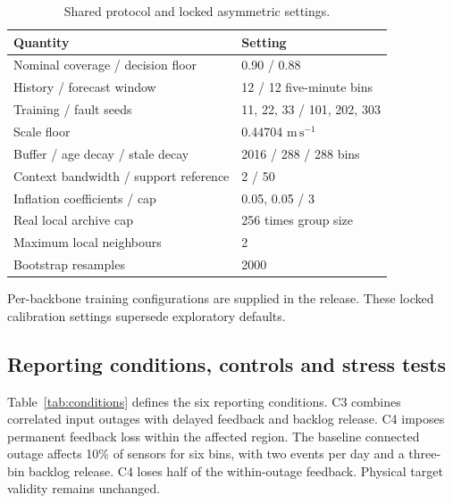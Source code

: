 \documentclass[pdflatex,sn-mathphys-num]{sn-jnl}
\newcommand{\ms}{\mathrm{m\,s^{-1}}}
\begin{document}
\begin{table}[!htbp]
\caption{Shared protocol and locked asymmetric settings.}\label{tab:settings}
\centering\setlength{\tabcolsep}{3pt}\small
\begin{tabular}{ll}\toprule
Quantity & Setting \\\midrule
Nominal coverage / decision floor & 0.90 / 0.88 \\
History / forecast window & 12 / 12 five-minute bins \\
Training / fault seeds & 11, 22, 33 / 101, 202, 303 \\
Scale floor & 0.44704 $\ms$ \\
Buffer / age decay / stale decay & 2016 / 288 / 288 bins \\
Context bandwidth / support reference & 2 / 50 \\
Inflation coefficients / cap & 0.05, 0.05 / 3 \\
Real local archive cap & 256 times group size \\
Maximum local neighbours & 2 \\
Bootstrap resamples & 2000 \\
\bottomrule\end{tabular}
\par\smallskip\footnotesize Per-backbone training configurations are supplied in the release. These locked calibration settings supersede exploratory defaults.
\end{table}
\FloatBarrier

\subsection{Reporting conditions, controls and stress tests}
Table~\ref{tab:conditions} defines the six reporting conditions. C3 combines correlated input outages with delayed feedback and backlog release. C4 imposes permanent feedback loss within the affected region. The baseline connected outage affects 10\% of sensors for six bins, with two events per day and a three-bin backlog release. C4 loses half of the within-outage feedback. Physical target validity remains unchanged.
\end{document}
